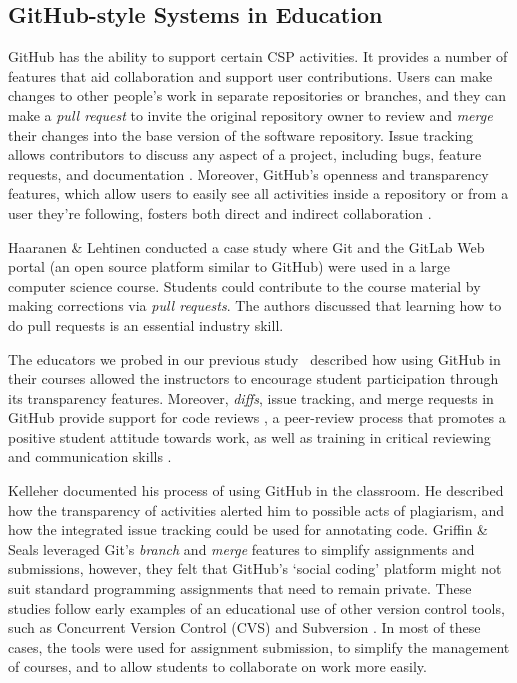 \subsection{GitHub-style Systems in Education}
GitHub has the ability to support certain CSP activities. It provides a number of features that aid collaboration and support user contributions. Users can make changes to other people's work in separate repositories or branches, and they can make a \emph{pull request} to invite the original repository owner to review and \emph{merge} their changes into the base version of the software repository. Issue tracking allows contributors to discuss any aspect of a project, including bugs, feature requests, and documentation \cite{bissyande2013got}. Moreover, GitHub's openness and transparency features, which allow users to easily see all activities inside a repository or from a user they're following, fosters both direct and indirect collaboration \cite{dabbish2012social}.

Haaranen \& Lehtinen \cite{haaranen2015teaching} conducted a case study where Git and the GitLab Web portal (an open source platform similar to GitHub) were used in a large computer science course. Students could contribute to the course material by making corrections via \emph{pull requests}. The authors discussed that learning how to do pull requests is an essential industry skill.

The educators we probed in our previous study~\cite{zagalsky2015emergence} described how using GitHub in their courses allowed the instructors to encourage student participation through its transparency features. Moreover, \emph{diffs}, issue tracking, and merge requests in GitHub provide support for code reviews \cite{kalliamvakou2014promises}, a peer-review process that promotes a positive student attitude towards work, as well as training in critical reviewing and communication skills \cite{hundhausen2013talking}.

Kelleher \cite{kelleher2014employing} documented his process of using GitHub in the classroom. He described how the transparency of activities alerted him to possible acts of plagiarism, and how the integrated issue tracking could be used for annotating code. Griffin \& Seals \cite{griffin2013github} leveraged Git's \emph{branch} and \emph{merge} features to simplify assignments and submissions, however, they felt that GitHub's `social coding' platform might not suit standard programming assignments that need to remain private. These studies follow early examples of an educational use of other version control tools, such as Concurrent Version Control (CVS) \cite{reid2005learning} and Subversion \cite{clifton2007subverting}. In most of these cases, the tools were used for assignment submission, to simplify the management of courses, and to allow students to collaborate on work more easily.
